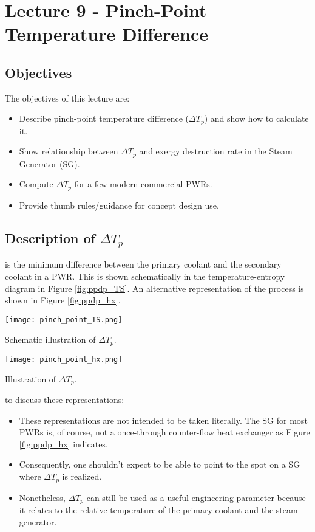 \chapter{Lecture 9 - Pinch-Point Temperature Difference}
\label{ch:ch9}
\section{Objectives}
The objectives of this lecture are:
\begin{itemize}
\item Describe pinch-point temperature difference ($\Delta T_{p}$) and show how to calculate it.
\item Show relationship between $\Delta T_{p}$ and exergy destruction rate in the Steam Generator (SG).
\item Compute $\Delta T_{p}$ for a few modern commercial PWRs.
\item Provide thumb rules/guidance for concept design use.
\end{itemize}


\section{Description of $\Delta T_{p}$}
 is the minimum difference between the primary coolant and the secondary coolant in a PWR.  This is shown schematically in the temperature-entropy diagram in Figure \ref{fig:ppdp_TS}. An alternative representation of the process is shown in Figure \ref{fig:ppdp_hx}.
\begin{marginfigure}
\texttt{[image: pinch\_point\_TS.png]}
\caption{Schematic illustration of $\Delta T_{p}$.}
\label{fig:ppdp_TS}
\end{marginfigure}


\begin{marginfigure}
\texttt{[image: pinch\_point\_hx.png]}
\caption{Illustration of $\Delta T_{p}$.}
\label{fig:ppdp_hx}
\end{marginfigure}

 to discuss these representations:

\begin{itemize}
\item These representations are not intended to be taken literally.  The SG for most PWRs is, of course, not a once-through counter-flow heat exchanger as Figure \ref{fig:ppdp_hx} indicates. 
\item Consequently, one shouldn't expect to be able to point to the spot on a SG where $\Delta T_{p}$ is realized.
\item Nonetheless, $\Delta T_{p}$ can still be used as a useful engineering parameter because it relates to the relative temperature of the primary coolant and the steam generator. 
\end{itemize}

